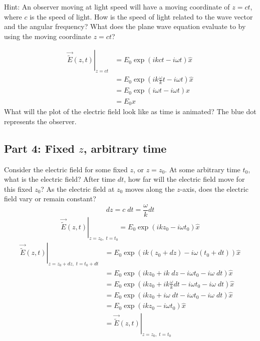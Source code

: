 \documentclass{article}
\begin{document}
Hint: An observer moving at light speed will have a moving coordinate of $z=ct$, where $c$ is the speed of light.  How is the speed of light related to the wave vector and the angular frequency?  What does the plane wave equation evaluate to by using the moving coordinate $z=ct$?

\begin{align}
     \left.\vec{\widetilde{E}}\left(z,t\right)\right\rvert_{z=ct} &= E_0 \exp \left(ikct- i \omega t\right) \hat{x}  \\
     &= E_0 \exp \left(ik\frac{\omega}{k}t - i \omega t\right) \hat{x}  \\
     &= E_0 \exp \left(i\omega t- i \omega t\right) \hat{x}  \\
     &= E_0 \hat{x} 
\end{align}
What will the plot of the electric field look like as time is animated?  The blue dot represents the observer.

\subsection{Part 4: Fixed $z$, arbitrary time}
Consider the electric field for some fixed $z$, or $z=z_0$.  At some arbitrary time $t_0$, what is the electric field?  After time $dt$,  how far will the electric field move for this fixed $z_0$?  As the electric field at $z_0$ moves along the $z$-axis, does the electric field vary or remain constant?
\begin{equation}
    dz = c\;dt = \frac{\omega}{k}dt
\end{equation}
\begin{equation}
    \left.\vec{\widetilde{E}}\left(z,t\right)\right\rvert_{z=z_0,\;t=t_0} = E_0 \exp \left(ikz_0- i \omega t_0\right) \hat{x}
\end{equation}
\begin{align}
     \left.\vec{\widetilde{E}}\left(z,t\right)\right\rvert_{z=z_0+dz,\;t=t_0+dt} &= E_0 \exp \left(ik(z_0+dz)- i \omega (t_0+dt)\right) \hat{x}  \\
     &= E_0 \exp \left(ikz_0+ik\;dz- i \omega t_0- i \omega\;dt\right) \hat{x}  \\
     &= E_0 \exp \left(ikz_0+ik\frac{\omega}{k}dt- i \omega t_0- i \omega\;dt\right) \hat{x}  \\
     &= E_0 \exp \left(ikz_0+i\omega\; dt- i \omega t_0- i \omega\;dt\right) \hat{x}  \\
     &= E_0 \exp \left(ikz_0- i \omega t_0\right) \hat{x}  \\
     &=\left.\vec{\widetilde{E}}\left(z,t\right)\right\rvert_{z=z_0,\;t=t_0}
\end{align}
\end{document}
